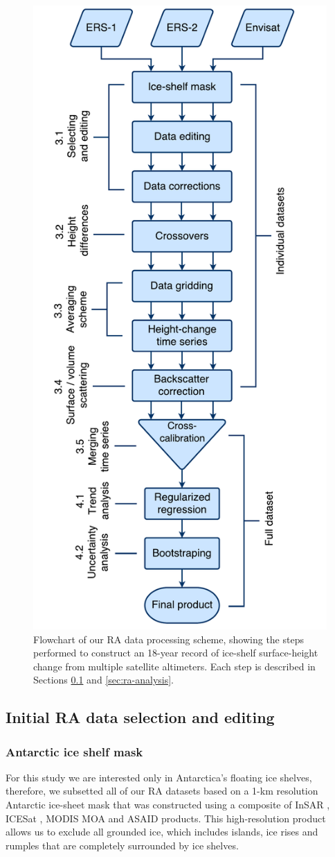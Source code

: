 \begin{figure}[!ht]
  \centering
  \includegraphics[width=.6\textwidth]{img/flowchart_v4.pdf}
  \caption[Flowchart of the processing scheme]{Flowchart of our RA data processing scheme, showing the steps performed to construct an 18-year record of ice-shelf surface-height change from multiple satellite altimeters. Each step is described in Sections \ref{sec:ra-processing} and \ref{sec:ra-analysis}.}
  \label{c2f2}
\end{figure}


\subsection{Initial RA data selection and editing}
\label{sec:ra-processing}

\subsubsection{Antarctic ice shelf mask}

\noindent
For this study we are interested only in Antarctica's floating ice shelves, therefore, we subsetted all of our RA datasets based on a 1-km resolution Antarctic ice-sheet mask \parencite{Depoorter2013} that was constructed using a composite of InSAR \parencite{Rignot2011}, ICESat \parencite{Brunt2010, Fricker2009}, MODIS MOA \parencite{Scambos2007} and ASAID \parencite{Bindschadler2011} products. This high-resolution product allows us to exclude all grounded ice, which includes islands, ice rises and rumples that are completely surrounded by ice shelves.

